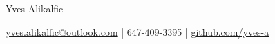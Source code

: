 

\centerline{\Huge{Yves Alikalfic}}

\vspace{5pt}


\centerline{\href{mailto:yves.alikalfic@outlook.ca}{yves.alikalfic@outlook.com} | 647-409-3395 | \href{https://github.com/yves-a}{github.com/yves-a}}

\vspace{-10pt}